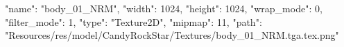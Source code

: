 {
  "name": "body_01_NRM",
  "width": 1024,
  "height": 1024,
  "wrap_mode": 0,
  "filter_mode": 1,
  "type": "Texture2D",
  "mipmap": 11,
  "path": "Resources/res/model/CandyRockStar/Textures/body_01_NRM.tga.tex.png"
}